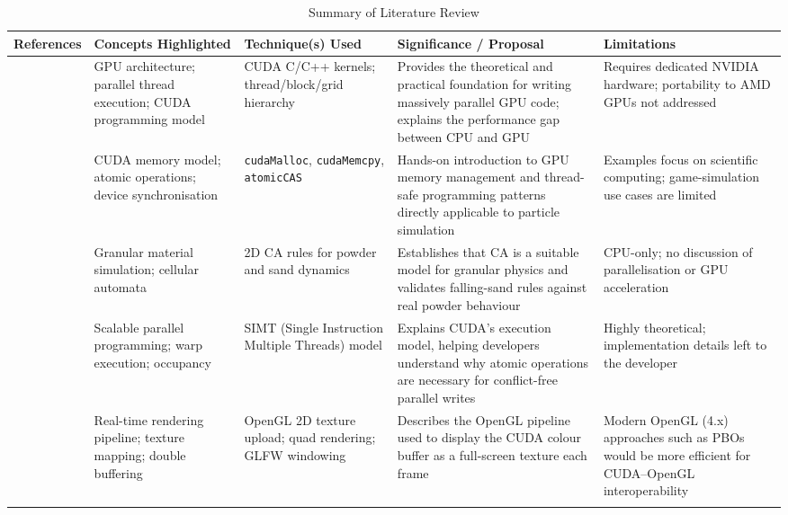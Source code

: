 \documentclass[12pt,a4paper]{article}
\begin{document}
\begin{longtable}[htp]{|p{2cm}|p{2.5cm}|p{2.5cm}|p{3cm}|p{3.5cm}|}

\hline \textbf{References} & \textbf{Concepts Highlighted} & \textbf{Technique(s) Used} & \textbf{Significance / Proposal} & \textbf{Limitations} \\

\hline \cite{kirk2016programming} & GPU architecture; parallel thread execution; CUDA programming model & CUDA C/C++ kernels; thread/block/grid hierarchy & Provides the theoretical and practical foundation for writing massively parallel GPU code; explains the performance gap between CPU and GPU & Requires dedicated NVIDIA hardware; portability to AMD GPUs not addressed \\

\hline \cite{sanders2010cuda} & CUDA memory model; atomic operations; device synchronisation & \texttt{cudaMalloc}, \texttt{cudaMemcpy}, \texttt{atomicCAS} & Hands-on introduction to GPU memory management and thread-safe programming patterns directly applicable to particle simulation & Examples focus on scientific computing; game-simulation use cases are limited \\

\hline \cite{mcivor2009cellular} & Granular material simulation; cellular automata & 2D CA rules for powder and sand dynamics & Establishes that CA is a suitable model for granular physics and validates falling-sand rules against real powder behaviour & CPU-only; no discussion of parallelisation or GPU acceleration \\

\hline \cite{nickolls2008scalable} & Scalable parallel programming; warp execution; occupancy & SIMT (Single Instruction Multiple Threads) model & Explains CUDA's execution model, helping developers understand why atomic operations are necessary for conflict-free parallel writes & Highly theoretical; implementation details left to the developer \\

\hline \cite{shreiner2013opengl} & Real-time rendering pipeline; texture mapping; double buffering & OpenGL 2D texture upload; quad rendering; GLFW windowing & Describes the OpenGL pipeline used to display the CUDA colour buffer as a full-screen texture each frame & Modern OpenGL (4.x) approaches such as PBOs would be more efficient for CUDA--OpenGL interoperability \\

\hline

\caption{Summary of Literature Review}
\label{Table1}

\end{longtable}
\end{document}
